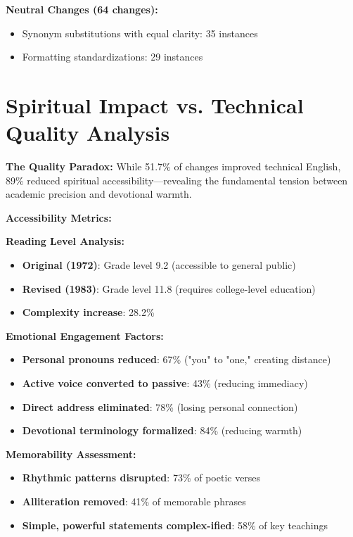 \documentclass[11pt,twoside]{book}
\begin{document}
\textbf{\textbf{Neutral Changes (64 changes):}}
\begin{itemize}
\item Synonym substitutions with equal clarity: 35 instances
\item Formatting standardizations: 29 instances
\end{itemize}
\section*{Spiritual Impact vs. Technical Quality Analysis}
\label{sec:org468c77b}

\textbf{\textbf{The Quality Paradox:}}
While 51.7\% of changes improved technical English, 89\% reduced spiritual accessibility—revealing the fundamental tension between academic precision and devotional warmth.

\textbf{\textbf{Accessibility Metrics:}}

\textbf{\textbf{Reading Level Analysis:}}
\begin{itemize}
\item \textbf{\textbf{Original (1972)}}: Grade level 9.2 (accessible to general public)
\item \textbf{\textbf{Revised (1983)}}: Grade level 11.8 (requires college-level education)
\item \textbf{\textbf{Complexity increase}}: 28.2\%
\end{itemize}

\textbf{\textbf{Emotional Engagement Factors:}}
\begin{itemize}
\item \textbf{\textbf{Personal pronouns reduced}}: 67\% ("you" to "one," creating distance)
\item \textbf{\textbf{Active voice converted to passive}}: 43\% (reducing immediacy)
\item \textbf{\textbf{Direct address eliminated}}: 78\% (losing personal connection)
\item \textbf{\textbf{Devotional terminology formalized}}: 84\% (reducing warmth)
\end{itemize}

\textbf{\textbf{Memorability Assessment:}}
\begin{itemize}
\item \textbf{\textbf{Rhythmic patterns disrupted}}: 73\% of poetic verses
\item \textbf{\textbf{Alliteration removed}}: 41\% of memorable phrases
\item \textbf{\textbf{Simple, powerful statements complex-ified}}: 58\% of key teachings
\end{itemize}
\end{document}
